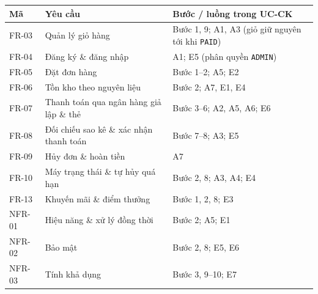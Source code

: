 \begin{longtable}{@{}p{2.2cm}p{5.0cm}p{8.8cm}@{}}
\toprule
\textbf{Mã} & \textbf{Yêu cầu} & \textbf{Bước / luồng trong UC-CK} \\
\midrule
\endhead
FR-03 & Quản lý giỏ hàng & Bước 1, 9; A1, A3 (giỏ giữ nguyên tới khi \texttt{PAID}) \\
FR-04 & Đăng ký \& đăng nhập & A1; E5 (phân quyền \texttt{ADMIN}) \\
FR-05 & Đặt đơn hàng & Bước 1--2; A5; E2 \\
FR-06 & Tồn kho theo nguyên liệu & Bước 2; A7, E1, E4 \\
FR-07 & Thanh toán qua ngân hàng giả lập \& thẻ & Bước 3--6; A2, A5, A6; E6 \\
FR-08 & Đối chiếu sao kê \& xác nhận thanh toán & Bước 7--8; A3; E5 \\
FR-09 & Hủy đơn \& hoàn tiền & A7 \\
FR-10 & Máy trạng thái \& tự hủy quá hạn & Bước 2, 8; A3, A4; E4 \\
FR-13 & Khuyến mãi \& điểm thưởng & Bước 1, 2, 8; E3 \\
NFR-01 & Hiệu năng \& xử lý đồng thời & Bước 2; A5; E1 \\
NFR-02 & Bảo mật & Bước 2, 8; E5, E6 \\
NFR-03 & Tính khả dụng & Bước 3, 9--10; E7 \\
\bottomrule
\end{longtable}
